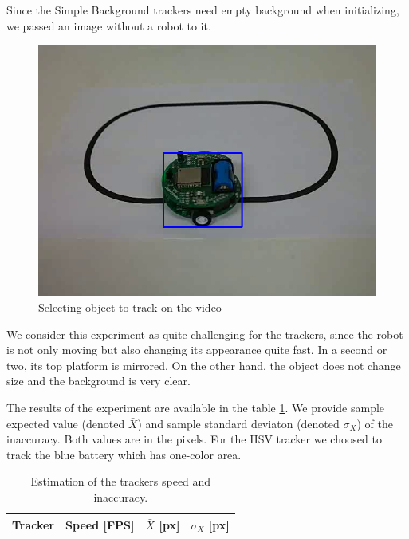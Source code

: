 Since the Simple Background trackers need empty background when
initializing, we passed an image without a robot to it.

\begin{figure}
\centering
\includegraphics[width=0.6\linewidth]{img/robot-oval.png}
\caption{Selecting object to track on the video}
\label{fig:robot-oval}
\end{figure}

We consider this experiment as quite challenging for the trackers, since the
robot is not only moving but also changing its appearance quite fast. In a
second or two, its top platform is mirrored. On the other hand, the object does
not change size and the background is very clear.

The results of the experiment are available in the table
\ref{table:experiment-robot}. We provide sample expected value (denoted
$\bar{X}$) and sample standard deviaton (denoted $\sigma_X$) of the
inaccuracy. Both values are in the pixels. For the HSV tracker we choosed to
track the blue battery which has one-color area.

\begin{table}
\centering
\begin{tabular}{l|r|r|r}
Tracker	& Speed [FPS] & $\bar{X}$ [px] & $\sigma_X$ [px] \\
\hline

\end{tabular}
\caption{Estimation of the trackers speed and inaccuracy.}
\label{table:experiment-robot}
\end{table}


